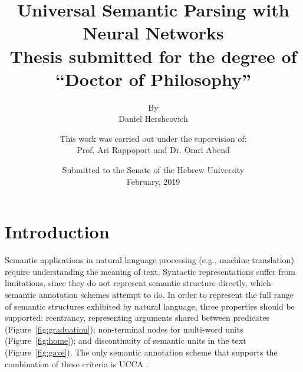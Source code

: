 \documentclass[12pt]{report}
\title{
\textbf{Universal Semantic Parsing with Neural Networks} \\
\vspace{2cm}
{\large Thesis submitted for the degree of \\
``Doctor of Philosophy''}
}
\author{
By \\
Daniel Hershcovich
\vspace{2cm}
}
\date{
Submitted to the Senate of the Hebrew University \\
February, 2019
}
\begin{document}
\maketitle
\clearpage
\title{}
\author{
This work was carried out under the supervision of: \\
Prof. Ari Rappoport and Dr. Omri Abend
}
\date{}
\maketitle


\section{Introduction}\label{sec:introduction}

Semantic applications in natural language processing (e.g., machine translation)
require understanding the meaning of text.
Syntactic representations suffer from limitations, since they do not
represent semantic structure directly,
which semantic annotation schemes attempt to do.
In order to represent the full range of semantic structures exhibited by
natural language, three properties should be supported: reentrancy,
representing arguments shared between predicates (Figure~\ref{fig:graduation});
non-terminal nodes for multi-word units (Figure~\ref{fig:home});
and discontinuity of semantic units in the text (Figure~\ref{fig:gave}).
The only semantic annotation scheme that supports the combination of these criteria is UCCA
\cite{abend2013universal}.
\end{document}
